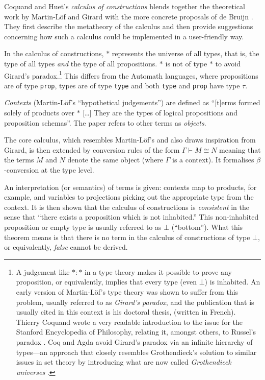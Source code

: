 \documentclass[12pt,toc=bibliography,numbers=noendperiod,
               footnotes=multiple,twoside]{scrartcl}
\begin{document}
Coquand and Huet's \emph{calculus of constructions} blends together the theoretical work by Martin-Löf and Girard with the more concrete proposals of de Bruijn \autocite{coquand_calculus_1988}. They first describe the metatheory of the calculus and then provide suggestions concerning how such a calculus could be implemented in a user-friendly way.

In the calculus of constructions, \(*\) represents the universe of all types, that is, the type of all types \emph{and} the type of all propositions. \(*\) is not of type \(*\) to avoid Girard's paradox.\footnote{A judgement like \(* : *\) in a type theory makes it possible to prove any proposition, or equivalently, implies that every type (even \(\bot\)) is inhabited. An early version of Martin-Löf's type theory was shown to suffer from this problem, usually referred to as \emph{Girard's paradox}, and the publication that is usually cited in this context is his doctoral thesis, \textcite{girard_interpretation_1972} (written in French). Thierry Coquand wrote a very readable introduction to the issue for the Stanford Encyclopedia of Philosophy, relating it, amongst others, to Russel's paradox \autocite{coquand_type_2014}. Coq and Agda avoid Girard's paradox via an infinite hierarchy of types---an approach that closely resembles Grothendieck's solution to similar issues in set theory by introducing what are now called \emph{Grothendieck universes} \autocite{artin_orie_1972}.} This differs from the Automath languages, where propositions are of type \texttt{prop}, types are of type \texttt{type} and both \texttt{type} and \texttt{prop} have type \(\tau\).

\emph{Contexts} (Martin-Löf's \enquote{hypothetical judgements}) are defined as \enquote{[t]erms formed solely of products over \(*\) [\dots] They are the types of logical propositions and proposition schemas}. The paper refers to other terms as \emph{objects}.

The core calculus, which resembles Martin-Löf's and also draws inspiration from Girard, is then extended by conversion rules of the form \(\Gamma \vdash M \cong N\) meaning that the terms \(M\) and \(N\) denote the same object (where \(\Gamma\) is a context). It formalises \(\beta\)-conversion at the type level.

An interpretation (or semantics) of terms is given: contexts map to products, for example, and variables to projections picking out the appropriate type from the context. It is then shown that the calculus of constructions is \emph{consistent} in the sense that \enquote{there exists a proposition which is not inhabited.} This non-inhabited proposition or empty type is usually referred to as \(\bot\) (\enquote{bottom}). What this theorem means is that there is no term in the calculus of constructions of type \(\bot\), or equivalently, \emph{false} cannot be derived.
\end{document}
